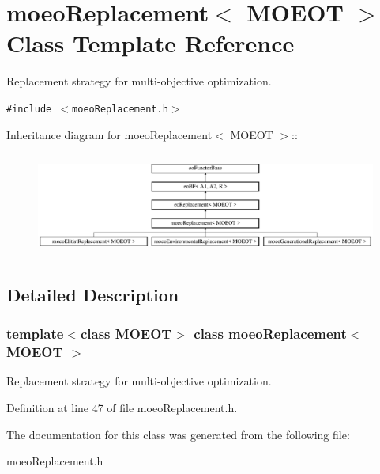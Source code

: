 \section{moeo\-Replacement$<$ MOEOT $>$ Class Template Reference}
\label{classmoeoReplacement}
Replacement strategy for multi-objective optimization.  


{\tt \#include $<$moeo\-Replacement.h$>$}

Inheritance diagram for moeo\-Replacement$<$ MOEOT $>$::\begin{figure}[H]
\begin{center}
\leavevmode
\includegraphics[height=3.43137cm]{classmoeoReplacement}
\end{center}
\end{figure}


\subsection{Detailed Description}
\subsubsection*{template$<$class MOEOT$>$ class moeo\-Replacement$<$ MOEOT $>$}

Replacement strategy for multi-objective optimization. 



Definition at line 47 of file moeo\-Replacement.h.

The documentation for this class was generated from the following file:\begin{CompactItemize}
\item 
moeo\-Replacement.h\end{CompactItemize}
